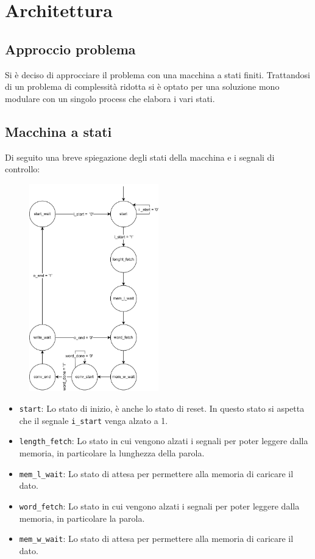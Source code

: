 \chapter{Architettura}
\section{Approccio problema}
Si è deciso di approcciare il problema con una macchina a stati finiti. Trattandosi di un problema di complessità ridotta si è optato per una soluzione mono modulare con un singolo process che elabora i vari stati.

\section{Macchina a stati}
Di seguito una breve spiegazione degli stati della macchina e i segnali di controllo:
\begin{figure}
    \includegraphics[trim=0cm 40cm 0cm 6.7cm, width=0.50\textwidth]{images/Capitolo2/vertical_fsm.png}
\end{figure}
\begin{itemize}
    \item \texttt{start}: Lo stato di inizio, è anche lo stato di reset. In questo stato si aspetta che il segnale \texttt{i\_start} venga alzato a 1.
    \item \texttt{length\_fetch}: Lo stato in cui vengono alzati i segnali per poter leggere dalla memoria, in particolare la lunghezza della parola.
    \item \texttt{mem\_l\_wait}: Lo stato di attesa per permettere alla memoria di caricare il dato.
    \item \texttt{word\_fetch}: Lo stato in cui vengono alzati i segnali per poter leggere dalla memoria, in particolare la parola.
    \item \texttt{mem\_w\_wait}: Lo stato di attesa per permettere alla memoria di caricare il dato.
\end{itemize}

